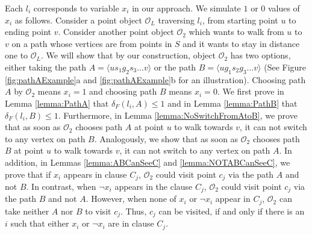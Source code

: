 \documentclass[12pt]{dalthesis}
\newcommand{\distF}{\delta_F}
\newcommand{\CO}{{\mathscr O}}
\newcommand{\cfev}{{l}}
\begin{document}
Each $\cfev_i$ corresponds to variable $x_i$ in our approach.
We simulate $1$ or $0$ values of $x_i$
as follows.
Consider a point object $\CO_L$ 
traversing $\cfev_i$, from starting point $u$ to ending point $v$. 
Consider 
another point object $\CO_2$ which wants to 
walk from $u$ to $v$
on a path whose vertices are from points in $S$ and it wants to stay in distance one 
to $\CO_L$. We will show that 
by our construction, object $\CO_2$ has two options, either taking 
the path $A = \langle us_1g_2s_3 \dots v \rangle$ or the path $B = \langle ug_1s_2g_3 \dots v \rangle$ 
(See Figure \ref{fig:pathAExample}a and \ref{fig:pathAExample}b for an illustration). 
Choosing path $A$ by $\CO_2$ means $x_i = 1$ and choosing path $B$ means $x_i = 0$.
We first prove in Lemma \ref{lemma:PathA} that $\distF(\cfev_i,A) \le 1 $ and 
in Lemma  \ref{lemma:PathB} that $\distF(\cfev_i,B) \le 1 $.
Furthermore, in
Lemma \ref{lemma:NoSwitchFromAtoB}, we prove that as soon as $\CO_2$ chooses 
path $A$ at point $u$ to walk towards $v$, 
it can not switch to any vertex on path $B$.
Analogously, we show that as soon as $\CO_2$ chooses path $B$ at point $u$ to walk towards $v$, 
it can not switch to any vertex on path $A$.
In addition, in Lemmas \ref{lemma:ABCanSeeC} and \ref{lemma:NOTABCanSeeC}, we prove that 
if $x_i$ appears in clause $C_j$,
$\CO_2$ could visit point $c_j$ via the path $A$ and not $B$. In contrast, 
when $\neg x_i$ appears in the clause $C_j$,
$\CO_2$ could visit point $c_j$ via the path $B$ and not $A$.
However, when none of  $x_i$ or $\neg x_i$ appear 
in $C_j$, $\CO_2$ can take neither $A$ nor $B$ to visit $c_j$.
Thus, $c_j$ can be visited, 
if and only if there is 
an $i$ such that 
either $x_i$ or 
$\neg x_i$ are in clause $C_j$.
\end{document}
